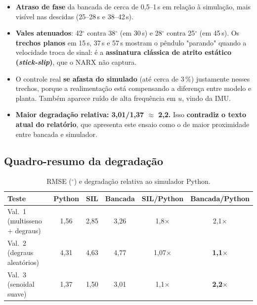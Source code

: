 \documentclass[12pt,a4paper]{article}
\newcommand{\graus}{$^\circ$}
\newcommand{\atencao}[1]{\textcolor{red!70!black}{\textbf{#1}}}
\begin{document}
\begin{itemize}
    \item \textbf{Atraso de fase} da bancada de cerca de 0,5--1\,s em relação à simulação, mais visível nas descidas (25--28\,s e 38--42\,s).
    \item \textbf{Vales atenuados}: 42\graus{} contra 38\graus{} (em 30\,s) e 28\graus{} contra 25\graus{} (em 45\,s). Os \textbf{trechos planos} em 15\,s, 37\,s e 57\,s mostram o pêndulo "parando" quando a velocidade troca de sinal: é a \textbf{assinatura clássica de atrito estático (\textit{stick-slip})}, que o NARX não captura.
    \item O controle real \textbf{se afasta do simulado} (até cerca de 3\,\%) justamente nesses trechos, porque a realimentação está compensando a diferença entre modelo e planta. Também aparece ruído de alta frequência em $u$, vindo da IMU.
    \item \atencao{Maior degradação relativa: 3,01/1,37 $\approx$ 2,2.} Isso \textbf{contradiz o texto atual do relatório}, que apresenta este ensaio como o de maior proximidade entre bancada e simulador.
\end{itemize}

\subsection{Quadro-resumo da degradação}

\begin{table}[H]
    \centering
    \caption{RMSE (\graus{}) e degradação relativa ao simulador Python.}
    \label{tab:degradacao}
    \begin{tabular}{@{}lccccc@{}}
        \toprule
        \textbf{Teste} & \textbf{Python} & \textbf{SIL} & \textbf{Bancada} & \textbf{SIL/Python} & \textbf{Bancada/Python} \\ \midrule
        Val.~1 (multisseno + degraus) & 1,56 & 2,85 & 3,26 & 1,8$\times$  & 2,1$\times$ \\
        Val.~2 (degraus aleatórios)   & 4,31 & 4,63 & 4,77 & 1,07$\times$ & \textbf{1,1$\times$} \\
        Val.~3 (senoidal suave)       & 1,37 & 1,50 & 3,01 & 1,1$\times$  & \textbf{2,2$\times$} \\ \bottomrule
    \end{tabular}
\end{table}

\end{document}
